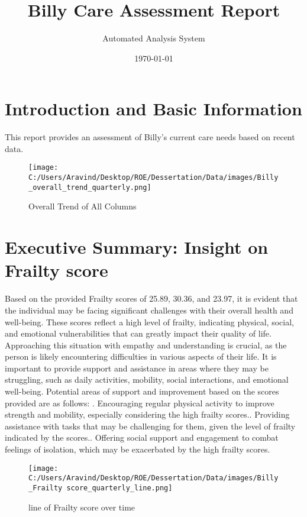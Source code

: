 \documentclass[10pt, a4paper]{article}%
\title{Billy Care Assessment Report}%
\author{Automated Analysis System}%
\date{\today}%
\begin{document}
%
\normalsize%
\maketitle%
\section{Introduction and Basic Information}%
\label{sec:IntroductionandBasicInformation}%
This report provides an assessment of Billy's current care needs based on recent data.%
\begin{figure}[H]%
\centering%
\texttt{[image: C:/Users/Aravind/Desktop/ROE/Dessertation/Data/images/Billy\_overall\_trend\_quarterly.png]}%
\caption{Overall Trend of All Columns}%
\end{figure}%
\section{Executive Summary: Insight on Frailty score}%
\label{sec:ExecutiveSummaryInsightonFrailtyscore}%
Based on the provided Frailty scores of 25.89, 30.36, and 23.97, it is evident that the individual may be facing significant challenges with their overall health and well{-}being. These scores reflect a high level of frailty, indicating physical, social, and emotional vulnerabilities that can greatly impact their quality of life.\newline%
\newline%
Approaching this situation with empathy and understanding is crucial, as the person is likely encountering difficulties in various aspects of their life. It is important to provide support and assistance in areas where they may be struggling, such as daily activities, mobility, social interactions, and emotional well{-}being.\newline%
\newline%
Potential areas of support and improvement based on the scores provided are as follows:\newline%
. Encouraging regular physical activity to improve strength and mobility, especially considering the high frailty scores.. Providing assistance with tasks that may be challenging for them, given the level of frailty indicated by the scores.. Offering social support and engagement to combat feelings of isolation, which may be exacerbated by the high frailty scores.%
\begin{figure}[H]%
\centering%
\texttt{[image: C:/Users/Aravind/Desktop/ROE/Dessertation/Data/images/Billy\_Frailty score\_quarterly\_line.png]}%
\caption{line of Frailty score over time}%
\end{figure}
\end{document}
